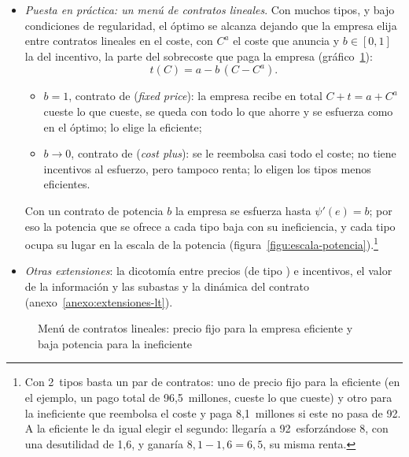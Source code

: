 \documentclass[11pt]{article}
\begin{document}
\begin{itemize}
\item \emph{Puesta en práctica: un menú de contratos lineales}. Con muchos tipos, y bajo condiciones de regularidad, el óptimo se alcanza dejando que la empresa elija entre contratos lineales en el coste\nocite{LaffontTirole1986Using,LaffontTirole1993Theory}, con $C^a$ el coste que anuncia y $b\in[0,1]$ la  del incentivo, la parte del sobrecoste que paga la empresa (gráfico~\ref{fig:menu-contratos}):
  \begin{equation}
  t(C)=a-b\,(C-C^a). \label{eq:menu}
  \end{equation}
  \begin{itemize}
  \item $b=1$, contrato de  (\emph{fixed price}): la empresa recibe en total $C+t=a+C^a$ cueste lo que cueste, se queda con todo lo que ahorre y se esfuerza como en el óptimo; lo elige la eficiente;
  \item $b\to 0$, contrato de  (\emph{cost plus}): se le reembolsa casi todo el coste; no tiene incentivos al esfuerzo, pero tampoco renta; lo eligen los tipos menos eficientes.
  \end{itemize}
  Con un contrato de potencia $b$ la empresa se esfuerza hasta $\psi'(e)=b$; por eso la potencia que se ofrece a cada tipo baja con su ineficiencia, y cada tipo ocupa su lugar en la escala de la potencia (figura~\ref{figu:escala-potencia}).\footnote{Con 2~tipos basta un par de contratos: uno de precio fijo para la eficiente (en el ejemplo, un pago total de 96,5~millones, cueste lo que cueste) y otro para la ineficiente que reembolsa el coste y paga 8,1~millones si este no pasa de 92. A la eficiente le da igual elegir el segundo: llegaría a 92~esforzándose 8, con una desutilidad de 1,6, y ganaría $8{,}1-1{,}6=6{,}5$, su misma renta.}
\item \emph{Otras extensiones}: la dicotomía entre precios (de tipo ) e incentivos, el valor de la información y las subastas y la dinámica del contrato (anexo~\ref{anexo:extensiones-lt}).
\end{itemize}

\begin{figure}[H]
\centering
\caption{Menú de contratos lineales: precio fijo para la empresa eficiente y baja potencia para la ineficiente}\label{fig:menu-contratos}
\end{figure}
\end{document}
